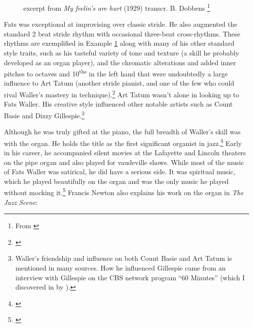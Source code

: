 \documentclass[11pt]{report}
\begin{document}
	
	\begin{figure}[ht]
		\centering
		\begin{minipage}{\textwidth}

			{%
\parindent 0pt
\ifx\preLilyPondExample \undefined
\else
  \expandafter\preLilyPondExample
\fi
\def\lilypondbook{}%

\ifx\postLilyPondExample \undefined
\else
  \expandafter\postLilyPondExample
\fi
}


		\caption{excerpt from \emph{My feelin's are hurt} (1929) transcr. B. Dobbens \protect\footnote{\scriptsize From \cite[]{grove-book:waller}}}
		\label{fig:hurt}
		
		\end{minipage}
	\end{figure}

	Fats was exceptional at improvising over classic stride. He also augmented the standard 2 beat stride rhythm with occasional three-beat cross-rhythms. These rhythms are exemplified in Example \ref{fig:hurt} along with many of his other standard style traits, such as his tasteful variety of tone and texture (a skill he probably developed as an organ player), and the chromatic alterations and added inner pitches to octaves and 10\textsuperscript{ths} in the left hand that were undoubtedly a large influence to Art Tatum (another stride pianist, and one of the few who could rival Waller's mastery in technique).\footnote{\cite[40]{grove-book:waller}} Art Tatum wasn't alone in looking up to Fats Waller. His creative style influenced other notable artists such as Count Basie and Dizzy Gillespie.\footnote{Waller's friendship and influence on both Count Basie and Art Tatum is mentioned in many sources. How he influenced Gillespie came from an interview with Gillespie on the CBS network program ``60 Minutes'' (which I discovered in  by \cite{transcriptions}).}



	\label{sec:organ_and_classical}
	Although he was truly gifted at the piano, the full breadth of Waller's skill was with the organ. He holds the title as the first significant organist in jazz.\footnote{\cite[40]{grove-book:waller}} Early in his career, he accompanied silent movies at the Lafayette and Lincoln theaters on the pipe organ and also played for vaudeville shows. While most of the music of Fats Waller was satirical, he did have a serious side. It was spiritual music, which he played beautifully on the organ and was the only music he played without mocking it.\footnote{\cite[8]{outside-insider}} Francis Newton also explains his work on the organ in \emph{The Jazz Scene}:
	
\end{document}
